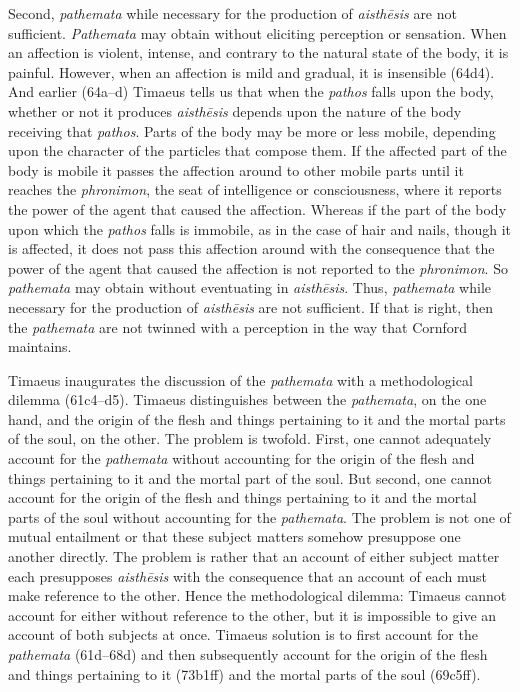 Second, \emph{pathemata} while necessary for the production of \emph{aisthēsis} are not sufficient. \emph{Pathemata} may obtain without eliciting perception or sensation. When an affection is violent, intense, and contrary to the natural state of the body, it is painful. However, when an affection is mild and gradual, it is insensible (64d4). And earlier (64a--d) Timaeus tells us that when the \emph{pathos} falls upon the body, whether or not it produces \emph{aisthēsis} depends upon the nature of the body receiving that \emph{pathos}. Parts of the body may be more or less mobile, depending upon the character of the particles that compose them. If the affected part of the body is mobile it passes the affection around to other mobile parts until it reaches the \emph{phronimon}, the seat of intelligence or consciousness, where it reports the power of the agent that caused the affection. Whereas if the part of the body upon which the \emph{pathos} falls is immobile, as in the case of hair and nails, though it is affected, it does not pass this affection around with the consequence that the power of the agent that caused the affection is not reported to the \emph{phronimon}. So \emph{pathemata} may obtain without eventuating in \emph{aisthēsis}. Thus, \emph{pathemata} while necessary for the production of \emph{aisthēsis} are not sufficient. If that is right, then the \emph{pathemata} are not twinned with a perception in the way that Cornford maintains.

Timaeus inaugurates the discussion of the \emph{pathemata} with a methodological dilemma (61c4--d5). Timaeus distinguishes between the \emph{pathemata}, on the one hand, and the origin of the flesh and things pertaining to it and the mortal parts of the soul, on the other. The problem is twofold. First, one cannot adequately account for the \emph{pathemata} without accounting for the origin of the flesh and things pertaining to it and the mortal part of the soul. But second, one cannot account for the origin of the flesh and things pertaining to it and the mortal parts of the soul without accounting for the \emph{pathemata}. The problem is not one of mutual entailment or that these subject matters somehow presuppose one another directly. The problem is rather that an account of either subject matter each presupposes \emph{aisthēsis} with the consequence that an account of each must make reference to the other. Hence the methodological dilemma: Timaeus cannot account for either without reference to the other, but it is impossible to give an account of both subjects at once. Timaeus solution is to first account for the \emph{pathemata} (61d--68d) and then subsequently account for the origin of the flesh and things pertaining to it (73b1ff) and the mortal parts of the soul (69c5ff). 

